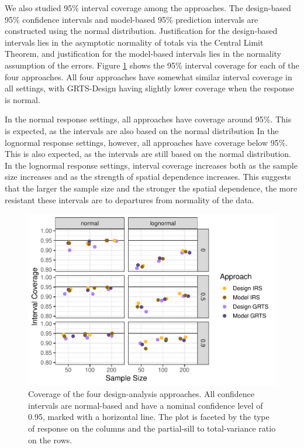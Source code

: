 \documentclass[]{elsarticle} %
\begin{document}
We also studied 95\% interval coverage among the approaches. The
design-based 95\% confidence intervals and model-based 95\% prediction
intervals are constructed using the normal distribution. Justification
for the design-based intervals lies in the asymptotic normality of
totals via the Central Limit Theorem, and justification for the
model-based intervals lies in the normality assumption of the errors.
Figure \ref{fig:figconf} shows the 95\% interval coverage for each of
the four approaches. All four approaches have somewhat similar interval
coverage in all settings, with GRTS-Design having slightly lower
coverage when the response is normal.

In the normal response settings, all approaches have coverage around
95\%. This is expected, as the intervals are also based on the normal
distribution In the lognormal response settings, however, all approaches
have coverage below 95\%. This is also expected, as the intervals are
still based on the normal distribution. In the lognormal response
settings, interval coverage increases both as the sample size increases
and as the strength of spatial dependence increases. This suggests that
the larger the sample size and the stronger the spatial dependence, the
more resistant these intervals are to departures from normality of the
data.

\begin{figure}
\includegraphics[width=1\linewidth]{manuscript_files/figure-latex/figconf-1} \caption{Coverage of the four design-analysis approaches. All confidence intervals are normal-based and have a nominal confidence level of 0.95, marked with a horizontal line. The plot is faceted by the type of response on the columns and the partial-sill to total-variance ratio on the rows.}\label{fig:figconf}
\end{figure}
\end{document}
